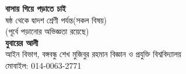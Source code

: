 \documentclass[6pt, serif]{beamer}
\begin{document}
\frame
{
\begin{center}
	{\Huge \textbf{বাসায় গিয়ে পড়াতে চাই}}\\
	\vspace{12pt}
	ষষ্ঠ থেকে দ্বাদশ শ্রেণী পর্যন্ত\hspace{4 pt}(সকল বিষয়)\\
	(পূর্বে পড়ানোর অভিজ্ঞতা রয়েছে)\\
	\vspace{8 pt}
	\textbf{{\Large যুবায়ের আলী}}\\
	{\small আইন বিভাগ, বঙ্গবন্ধু শেখ মুজিবুর রহমান বিজ্ঞান ও প্রযুক্তি বিশ্ববিদ্যালয়}\\
	মোবাইল: 014-0063-2771
\end{center}
}
\end{document}
